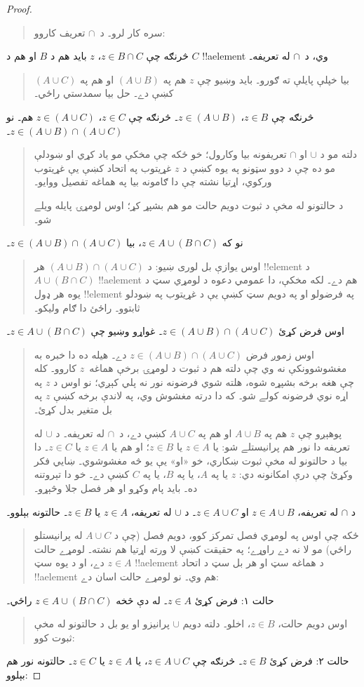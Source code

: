 \documentclass[../../../include/open-logic-section]{subfiles}
\begin{document}
\begin{proof}
\begin{quote}
سره کار لرو۔ د~$\cap$
تعريف کاروو:
\end{quote}
څرنګه چې $z \in B \cap C$،
$z$ بايد هم د $B$ او هم د $C$
!!a{element} وي، د~$\cap$
له تعريفه۔
\begin{quote}
بيا خپلې پايلې ته ګورو۔
بايد وښيو چې $z$ هم
په $(A \cup B)$ او هم
په $(A \cup C)$ کښې
دے۔ حل بيا سمدستي راځي۔
\end{quote}
څرنګه چې $z \in B$،
$z \in (A \cup B)$۔
څرنګه چې $z \in C$،
$z \in (A
\cup C)$ هم۔ نو
$z \in (A \cup B) \cap (A \cup C)$۔
\begin{quote}
دلته مو د $\cup$ او $\cap$
تعريفونه بيا وکارول؛ خو ځکه
چې مخکې مو ياد کړي او ښودلې
مو ده چې د دوو سټونو په يوه کښې د $z$
غړيتوب په اتحاد کښې يې غړيتوب ورکوي،
اړتيا نشته
چې دا ګامونه بيا په هماغه
تفصيل ووايو۔

د حالتونو له مخې د ثبوت
دويم حالت مو هم بشپړ کړ؛
اوس لومړۍ پايله ويلے شو۔
\end{quote}
نو که $z \in A \cup (B \cap C)$،
بيا $z \in (A \cup B) \cap (A \cup C)$۔
\begin{quote}
اوس يوازې بل لوری ښيو:
د $(A \cup B) \cap (A \cup C)$
هر !!{element} د
$A \cup (B \cap
C)$ !!a{element} هم دے۔
لکه مخکې، دا عمومي دعوه
د لومړي سټ د يوه هر ډول
!!{element} په فرضولو
او په دويم سټ کښې يې
د غړيتوب په ښودلو ثابتوو۔
راځئ دا ګام وليکو۔
\end{quote}
اوس فرض کړئ
$z \in (A \cup B) \cap (A \cup C)$۔
غواړو وښيو چې
$z \in A \cup (B \cap C)$۔
\begin{quote}
اوس زموږ فرض
$z \in (A \cup B) \cap (A
\cup C)$ دے۔ هيله ده
دا خبره به مغشوشوونکې
نه وي چې دلته هم د ثبوت
د لومړۍ برخې هماغه~$z$
کاروو۔ کله چې هغه برخه
بشپړه شوه، هلته شوي
فرضونه نور نه پلي کېږي؛
نو اوس د $z$ په اړه
نوي فرضونه کولے شو۔
که دا درته مغشوش وي،
په لاندې برخه کښې $z$
په بل متغير بدل کړئ۔

پوهېږو چې $z$ هم په
$A \cup B$ او هم په
$A \cup C$ کښې دے،
د~$\cap$ له تعريفه۔
د $\cup$ له تعريفه
دا نور هم پرانيستلے شو:
يا $z \in A$ يا
$z \in B$؛ او هم
يا $z \in A$ يا $z \in
C$۔ دا بيا د حالتونو له مخې
ثبوت ښکاري، خو «او» يې
يو څه مغشوشوي۔ ښايي فکر
وکړئ چې درې امکانونه دي:
$z$ يا په $A$، يا په
$B$، يا په $C$ کښې دے۔
خو دا تېروتنه ده۔ بايد
پام وکړو او هر فصل
جلا وڅېړو۔
\end{quote}
د $\cap$ له تعريفه،
$z \in A \cup B$ او
$z \in A \cup C$۔
د $\cup$ له تعريفه،
$z \in A$ يا $z \in B$۔
حالتونه بېلوو۔
\begin{quote}
ځکه چې اوس په لومړي فصل
تمرکز کوو، دويم فصل
(چې د $A \cup C$ له
پرانيستلو راځي) مو لا
نه دے راوړے؛ په حقيقت
کښې لا ورته اړتيا هم
نشته۔ لومړے حالت
$z \in A$ دے، او د يوه
سټ !!a{element} د هماغه
سټ او هر بل سټ د اتحاد
!!a{element} هم وي۔
نو لومړے حالت اسان دے:
\end{quote}
حالت ۱: فرض کړئ
$z \in A$۔ له دې څخه
$z \in A \cup (B \cap
C)$ راځي۔
\begin{quote}
اوس دويم حالت،
$z \in B$، اخلو۔
دلته دويم $\cup$
پرانيزو او يو بل
د حالتونو له مخې
ثبوت کوو:
\end{quote}
حالت ۲: فرض کړئ
$z \in B$۔ څرنګه چې
$z \in A \cup C$،
يا $z \in A$ يا
$z \in C$۔ حالتونه
نور هم بېلوو:


\end{proof}
\end{document}
